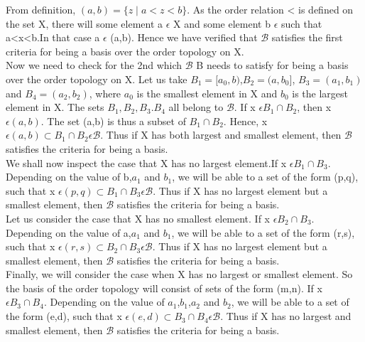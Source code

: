 \documentclass[a4paper,english,12pt]{article}
\begin{document}
\begin{defn}
\vspace{1mm}
From definition, $(a,b)=\{z\mid a<z<b\}$. As the order relation < is defined on the set X, there will some element a $\epsilon$ X and some element b $\epsilon$ such that a<x<b.In that case a $\epsilon$ (a,b). Hence we have verified that $\mathscr{B}$ satisfies the first criteria for being a basis over the order topology on X.\\
Now we need to check for the 2nd  which $\mathscr{B}$ B needs to satisfy for being a basis over the order topology on X. Let us take $B_1=[a_0,b)$,$B_2=(a,b_0]$, $B_3=(a_1,b_1)$ and $B_4=(a_2,b_2)$, where $a_0$ is the smallest element in X and $b_0$ is the largest element in X. The sets $B_1,B_2,B_3.B_4$ all belong to $\mathscr{B}$.
If x $\epsilon B_1 \cap B_2$, then x $\epsilon (a,b)$. The set (a,b) is thus a subset of $B_1 \cap B_2$. Hence, x $\epsilon (a,b) \subset B_1 \cap B_2 \epsilon \mathscr{B}$. Thus if X has both largest and smallest element, then $\mathscr{B}$ satisfies the criteria for being a basis.\\
\vspace{1mm}
We shall now inspect the case that X has no largest element.If x $\epsilon B_1 \cap B_3$. Depending on the value of b,$a_1$ and $b_1$, we will be able to a set of the form (p,q), such that  x $\epsilon (p,q) \subset B_1 \cap B_3 \epsilon \mathscr{B}$. Thus if X has no largest element but a smallest element, then $\mathscr{B}$ satisfies the criteria for being a basis.\\
\vspace{1mm}
Let us consider the case that X has no smallest element. If x $\epsilon B_2 \cap B_3$. Depending on the value of a,$a_1$ and $b_1$, we will be able to a set of the form (r,s), such that  x $\epsilon (r,s) \subset B_2 \cap B_3 \epsilon \mathscr{B}$. Thus if X has no largest element but a smallest element, then $\mathscr{B}$ satisfies the criteria for being a basis.\\
\vspace{1mm}
Finally, we will consider the case when X has no largest or smallest element. So the basis of the order topology will consist of sets of the form (m,n). If x $\epsilon B_3 \cap B_4$. Depending on the value of $a_1$,$b_1$,$a_2$ and $b_2$, we will be able to a set of the form (e,d), such that  x $\epsilon (e,d) \subset B_3 \cap B_4 \epsilon \mathscr{B}$. Thus if X has no largest and smallest element, then $\mathscr{B}$ satisfies the criteria for being a basis.\\
\vspace{1mm}

\end{defn}
\end{document}
